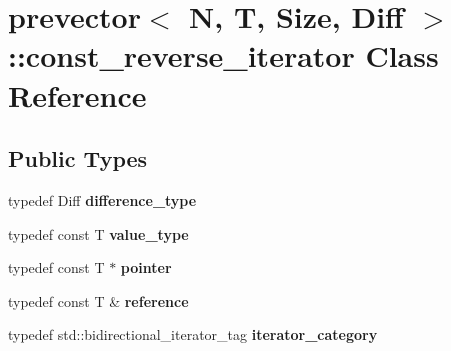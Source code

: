 \hypertarget{classprevector_1_1const__reverse__iterator}{}\section{prevector$<$ N, T, Size, Diff $>$\+::const\+\_\+reverse\+\_\+iterator Class Reference}
\label{classprevector_1_1const__reverse__iterator}
\subsection*{Public Types}
\begin{DoxyCompactItemize}
\item 
\mbox{\label{classprevector_1_1const__reverse__iterator_a9dbda696cb2dcbe5ea56dcbdd47976d9}} 
typedef Diff {\bfseries difference\+\_\+type}
\item 
\mbox{\label{classprevector_1_1const__reverse__iterator_ade957c473a494e6d51f240459e8a233f}} 
typedef const T {\bfseries value\+\_\+type}
\item 
\mbox{\label{classprevector_1_1const__reverse__iterator_a8e9d9876d10d29e9e33a26c561da2574}} 
typedef const T $\ast$ {\bfseries pointer}
\item 
\mbox{\label{classprevector_1_1const__reverse__iterator_ac1a9b32b13a1c9f79c7a69b136c9517b}} 
typedef const T \& {\bfseries reference}
\item 
\mbox{\label{classprevector_1_1const__reverse__iterator_a95e256c2f41ed8b914677594e6f22352}} 
typedef std\+::bidirectional\+\_\+iterator\+\_\+tag {\bfseries iterator\+\_\+category}
\end{DoxyCompactItemize}
